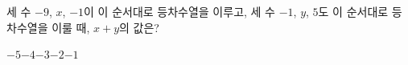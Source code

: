 세 수 $-9$, $x$, $-1$이 이 순서대로 등차수열을 이루고, 세 수 $-1$, $y$, $5$도 이 순서대로 등차수열을 이룰 때, $x+y$의 값은?
\begin{choices32}{$-5$}{$-4$}{$-3$}{$-2$}{$-1$}\end{choices32}
